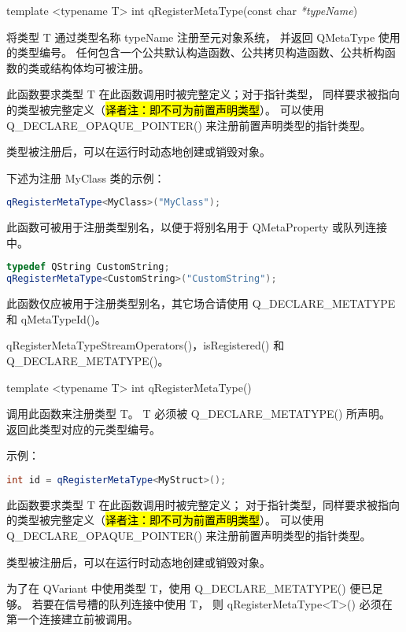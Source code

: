 template <typename T> int qRegisterMetaType(const char \emph{*typeName})

将类型 T 通过类型名称 typeName 注册至元对象系统，
并返回 QMetaType 使用的类型编号。
任何包含一个公共默认构造函数、公共拷贝构造函数、公共析构函数的类或结构体均可被注册。

此函数要求类型 T 在此函数调用时被完整定义；对于指针类型，
同样要求被指向的类型被完整定义（\hl{译者注：即不可为前置声明类型}）。
可以使用 Q\_DECLARE\_OPAQUE\_POINTER() 来注册前置声明类型的指针类型。

类型被注册后，可以在运行时动态地创建或销毁对象。

下述为注册 MyClass 类的示例：

\begin{lstlisting}[language=C++]
qRegisterMetaType<MyClass>("MyClass");
\end{lstlisting}

此函数可被用于注册类型别名，以便于将别名用于 QMetaProperty 或队列连接中。

\begin{lstlisting}[language=C++]
typedef QString CustomString;
qRegisterMetaType<CustomString>("CustomString");
\end{lstlisting}

\begin{warning}
此函数仅应被用于注册类型别名，其它场合请使用 Q\_DECLARE\_METATYPE 和 qMetaTypeId()。
\end{warning}

\begin{seeAlso}
qRegisterMetaTypeStreamOperators()，isRegistered() 和 Q\_DECLARE\_METATYPE()。
\end{seeAlso}

template <typename T> int qRegisterMetaType()

调用此函数来注册类型 T。
T 必须被 Q\_DECLARE\_METATYPE() 所声明。
返回此类型对应的元类型编号。

示例：

\begin{lstlisting}[language=C++]
int id = qRegisterMetaType<MyStruct>();
\end{lstlisting}

此函数要求类型 T 在此函数调用时被完整定义；
对于指针类型，同样要求被指向的类型被完整定义（\hl{译者注：即不可为前置声明类型}）。
可以使用 Q\_DECLARE\_OPAQUE\_POINTER() 来注册前置声明类型的指针类型。

类型被注册后，可以在运行时动态地创建或销毁对象。

为了在 QVariant 中使用类型 T，使用 Q\_DECLARE\_METATYPE() 便已足够。
若要在信号槽的队列连接中使用 T，
则 qRegisterMetaType<T>() 必须在第一个连接建立前被调用。

